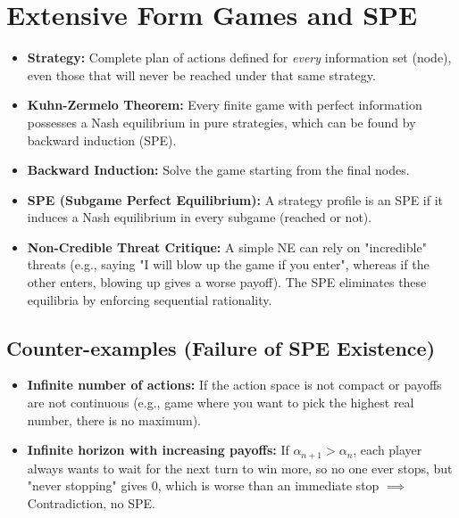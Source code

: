 \documentclass[10pt,a4paper]{article}
\begin{document}
\section{Extensive Form Games and SPE}
\begin{itemize}[leftmargin=*]
    \item \textbf{Strategy:} Complete plan of actions defined for \textit{every} information set (node), even those that will never be reached under that same strategy.
    \item \textbf{Kuhn-Zermelo Theorem:} Every finite game with perfect information possesses a Nash equilibrium in pure strategies, which can be found by backward induction (SPE).
    \item \textbf{Backward Induction:} Solve the game starting from the final nodes.
    \item \textbf{SPE (Subgame Perfect Equilibrium):} A strategy profile is an SPE if it induces a Nash equilibrium in every subgame (reached or not).
    \item \textbf{Non-Credible Threat Critique:} A simple NE can rely on "incredible" threats (e.g., saying "I will blow up the game if you enter", whereas if the other enters, blowing up gives a worse payoff). The SPE eliminates these equilibria by enforcing sequential rationality.
\end{itemize}

\subsection{Counter-examples (Failure of SPE Existence)}
\begin{itemize}
    \item \textbf{Infinite number of actions:} If the action space is not compact or payoffs are not continuous (e.g., game where you want to pick the highest real number, there is no maximum).
    \item \textbf{Infinite horizon with increasing payoffs:} If $\alpha_{n+1} > \alpha_n$, each player always wants to wait for the next turn to win more, so no one ever stops, but "never stopping" gives 0, which is worse than an immediate stop $\implies$ Contradiction, no SPE.
\end{itemize}
\end{document}
